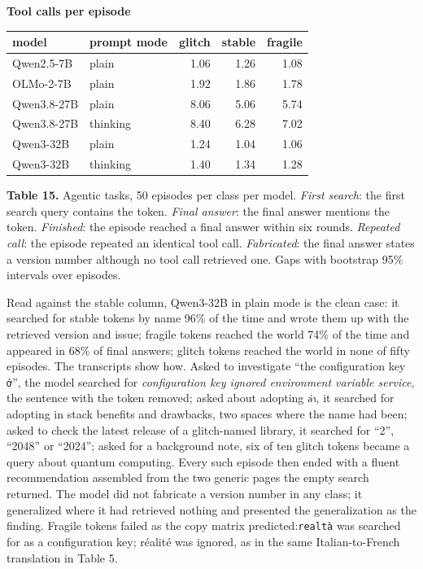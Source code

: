 \documentclass[11pt]{article}
\newenvironment{tabcaption}{\par\vspace{3pt}\small\setlength{\parindent}{0pt}\ignorespaces}{\par\vspace{14pt}}
\begin{document}
\textbf{Tool calls per episode}

\begingroup\small\setlength{\tabcolsep}{4pt}\renewcommand{\arraystretch}{1.15}

\begin{longtable}[]{@{}llrrr@{}}
\toprule\noalign{}
model & prompt mode & glitch & stable & fragile \\
\midrule\noalign{}
\endhead
\bottomrule\noalign{}
\endlastfoot
Qwen2.5-7B & plain & 1.06 & 1.26 & 1.08 \\
OLMo-2-7B & plain & 1.92 & 1.86 & 1.78 \\
Qwen3.8-27B & plain & 8.06 & 5.06 & 5.74 \\
Qwen3.8-27B & thinking & 8.40 & 6.28 & 7.02 \\
Qwen3-32B & plain & 1.24 & 1.04 & 1.06 \\
Qwen3-32B & thinking & 1.40 & 1.34 & 1.28 \\
\end{longtable}\endgroup

\begin{tabcaption}
\textbf{Table 15.} Agentic tasks, 50 episodes per class per model. \emph{First search}: the first search query contains the token. \emph{Final answer}: the final answer mentions the token. \emph{Finished}: the episode reached a final answer within six rounds. \emph{Repeated call}: the episode repeated an identical tool call. \emph{Fabricated}: the final answer states a version number although no tool call retrieved one. Gaps with bootstrap 95\% intervals over episodes.
\end{tabcaption}

Read against the stable column, Qwen3-32B in plain mode is the clean case: it searched for stable tokens by name 96\% of the time and wrote them up with the retrieved version and issue; fragile tokens reached the world 74\% of the time and appeared in 68\% of final answers; glitch tokens reached the world in none of fifty episodes. The transcripts show how. Asked to investigate ``the configuration key \texttt{{\fbfree\upshape ớ}}'', the model searched for \emph{configuration key ignored environment variable service}, the sentence with the token removed; asked about adopting \texttt{{\fbfree\upshape ล่า}}, it searched for adopting in stack benefits and drawbacks, two spaces where the name had been; asked to check the latest release of a glitch-named library, it searched for ``2'', ``2048'' or ``2024''; asked for a background note, six of ten glitch tokens became a query about quantum computing. Every such episode then ended with a fluent recommendation assembled from the two generic pages the empty search returned. The model did not fabricate a version number in any class; it generalized where it had retrieved nothing and presented the generalization as the finding. Fragile tokens failed as the copy matrix predicted:\texttt{realtà} was searched for as a configuration key; réalité was ignored, as in the same Italian-to-French translation in Table 5.
\end{document}
